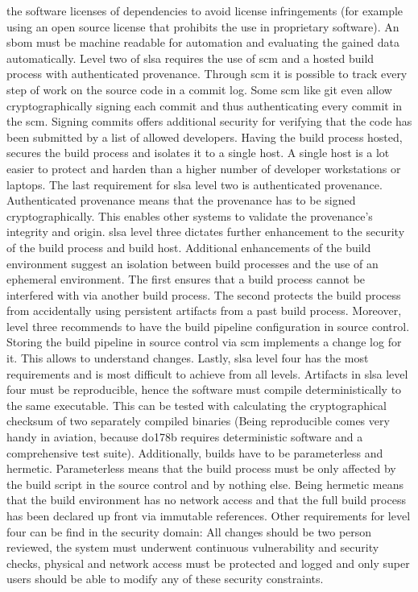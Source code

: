 \documentclass[titlepage]{report}
\begin{document}
the software licenses of dependencies to avoid license infringements (for example using an open source license that prohibits the use in proprietary software)\cite{SBOM}. An \gls{sbom} must be machine readable for automation and evaluating the gained data
automatically. Level two of \gls{slsa} requires the use of \gls{scm} and a hosted build process with authenticated provenance\cite{SLSALevels}. Through \gls{scm} it is possible to track every step of work on the source code in a commit log. Some \gls{scm} like
git even allow cryptographically signing each commit and thus authenticating every commit in the \gls{scm}. Signing commits offers additional security for verifying that the code has been submitted by a list of allowed developers. Having the build process
hosted, secures the build process and isolates it to a single host. A single host is a lot easier to protect and harden than a higher number of developer workstations or laptops. The last requirement for \gls{slsa} level two is authenticated provenance.
Authenticated provenance means that the provenance has to be signed cryptographically. This enables other systems to validate the provenance's integrity and origin. \gls{slsa} level three dictates further enhancement to the security of the build process
and build host. Additional enhancements of the build environment suggest an isolation between build processes and the use of an ephemeral environment. The first ensures that a build process cannot be interfered with via another build process. The second
protects the build process from accidentally using persistent artifacts from a past build process. Moreover, level three recommends to have the build pipeline configuration in source control\cite{SLSARequirements}. Storing the build pipeline in source control
via \gls{scm} implements a change log for it. This allows to understand changes. Lastly, \gls{slsa} level four has the most requirements and is most difficult to achieve from all levels. Artifacts in \gls{slsa} level four must be reproducible, hence the software
must compile deterministically to the same executable\cite{SLSARequirements}. This can be tested with calculating the cryptographical checksum of two separately compiled binaries (Being reproducible comes very handy in aviation, because \gls{do178b} requires deterministic software and a comprehensive test suite).
Additionally, builds have to be parameterless and hermetic. Parameterless means that the build process must be only affected by the build script in the source control and by nothing else. Being hermetic means that the build environment has no network access
and that the full build process has been declared up front via immutable references\cite{SLSARequirements}. Other requirements for level four can be find in the security domain: All changes should be two person reviewed, the system must underwent continuous
vulnerability and security checks, physical and network access must be protected and logged and only super users should be able to modify any of these security constraints\cite{SLSARequirements}.
\end{document}
